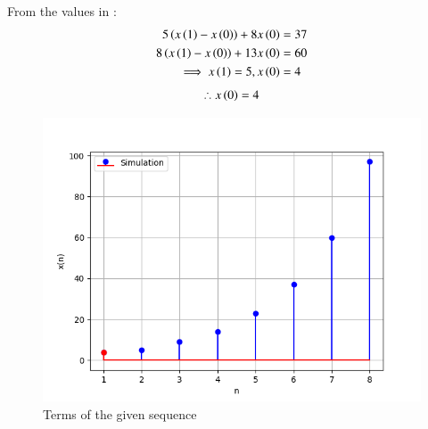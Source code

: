 \documentclass[journal,12pt,onecolumn]{IEEEtran}
\begin{document}
	From the values in :
	\begin{align}
		5 \left(x\left(1\right)-x\left(0\right)\right) + 8 x\left(0\right) &=37\\
		8 \left(x\left(1\right)-x\left(0\right)\right) + 13 x\left(0\right) &=60\\
		\implies x\left(1\right) =5, x\left(0\right) &=4
	\end{align}
	\begin{align}
		\therefore {x\ensuremath{\left(0\right)}=4}
	\end{align}
	\begin{figure}[ht]
		\includegraphics[width = \columnwidth]{figs/fig4}
		\caption{Terms of the given sequence}
		\centering
		\label{fig: fig4}
	\end{figure}
\end{document}
